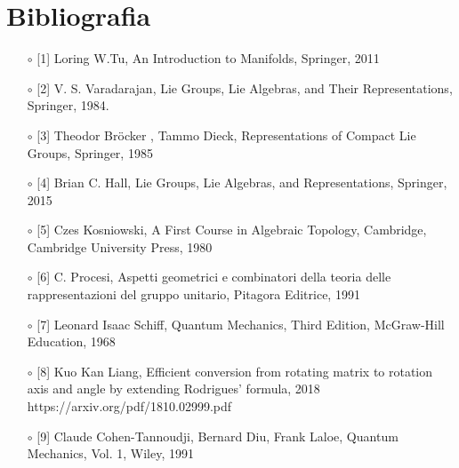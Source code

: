 \documentclass[12pt,a4paper]{report}
\theoremstyle{definition}
\theoremstyle{Theorem}
\theoremstyle{definition}
\theoremstyle{definition}
\theoremstyle{definition}
\begin{document}
\chapter*{Bibliografia}
\begin{itemize}
	\item[$\circ$] [1] Loring W.Tu, An Introduction to Manifolds, Springer, 2011
	\item[$\circ$] [2] V. S. Varadarajan, Lie Groups, Lie Algebras, and Their Representations, Springer,
	1984.
	\item[$\circ$] [3] Theodor Bröcker , Tammo Dieck, Representations of Compact Lie Groups, Springer, 1985
	\item[$\circ$] [4] Brian C. Hall, Lie Groups, Lie Algebras, and Representations, Springer, 2015
	\item [$\circ$] [5] Czes Kosniowski, A First Course in Algebraic Topology, Cambridge, Cambridge University Press, 1980
	\item [$\circ$] [6] C. Procesi, Aspetti geometrici e combinatori della teoria delle rappresentazioni del gruppo unitario, Pitagora Editrice, 1991
	\item [$\circ$] [7] Leonard Isaac Schiff,
	Quantum Mechanics, Third Edition, McGraw-Hill Education, 1968
	\item [$\circ$] [8] Kuo Kan Liang, Efficient conversion from rotating matrix to rotation axis and angle by extending Rodrigues' formula, 2018\\
	https://arxiv.org/pdf/1810.02999.pdf
	\item [$\circ$] [9]  Claude Cohen-Tannoudji, Bernard Diu, Frank Laloe, Quantum Mechanics, Vol. 1, Wiley, 1991
\end{itemize}
\end{document}
